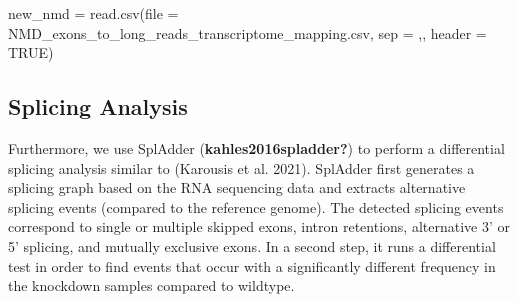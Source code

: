 \documentclass[
  letterpaper,
  DIV=11,
  numbers=noendperiod]{scrartcl}
\newenvironment{Shaded}{\begin{snugshade}}{\end{snugshade}}
\newcommand{\AttributeTok}[1]{\textcolor[rgb]{0.40,0.45,0.13}{#1}}
\newcommand{\BuiltInTok}[1]{\textcolor[rgb]{0.00,0.23,0.31}{#1}}
\newcommand{\ConstantTok}[1]{\textcolor[rgb]{0.56,0.35,0.01}{#1}}
\newcommand{\DataTypeTok}[1]{\textcolor[rgb]{0.68,0.00,0.00}{#1}}
\newcommand{\ExtensionTok}[1]{\textcolor[rgb]{0.00,0.23,0.31}{#1}}
\newcommand{\FunctionTok}[1]{\textcolor[rgb]{0.28,0.35,0.67}{#1}}
\newcommand{\NormalTok}[1]{\textcolor[rgb]{0.00,0.23,0.31}{#1}}
\newcommand{\OtherTok}[1]{\textcolor[rgb]{0.00,0.23,0.31}{#1}}
\newcommand{\StringTok}[1]{\textcolor[rgb]{0.13,0.47,0.30}{#1}}
\newcommand{\VariableTok}[1]{\textcolor[rgb]{0.07,0.07,0.07}{#1}}
\begin{document}
\begin{Shaded}
\begin{Highlighting}[]
\NormalTok{new\_nmd }\OtherTok{=} \FunctionTok{read.csv}\NormalTok{(}\AttributeTok{file =} \StringTok{\textquotesingle{}NMD\_exons\_to\_long\_reads\_transcriptome\_mapping.csv\textquotesingle{}}\NormalTok{, }\AttributeTok{sep =} \StringTok{\textquotesingle{},\textquotesingle{}}\NormalTok{, }\AttributeTok{header =} \ConstantTok{TRUE}\NormalTok{)}
\end{Highlighting}
\end{Shaded}

\hypertarget{splicing-analysis}{%
\subsection{Splicing Analysis}\label{splicing-analysis}}

Furthermore, we use SplAdder (\textbf{kahles2016spladder?}) to perform a
differential splicing analysis similar to (Karousis et al. 2021).
SplAdder first generates a splicing graph based on the RNA sequencing
data and extracts alternative splicing events (compared to the reference
genome). The detected splicing events correspond to single or multiple
skipped exons, intron retentions, alternative 3' or 5' splicing, and
mutually exclusive exons. In a second step, it runs a differential test
in order to find events that occur with a significantly different
frequency in the knockdown samples compared to wildtype.

\begin{Shaded}
\end{Shaded}
\end{document}
